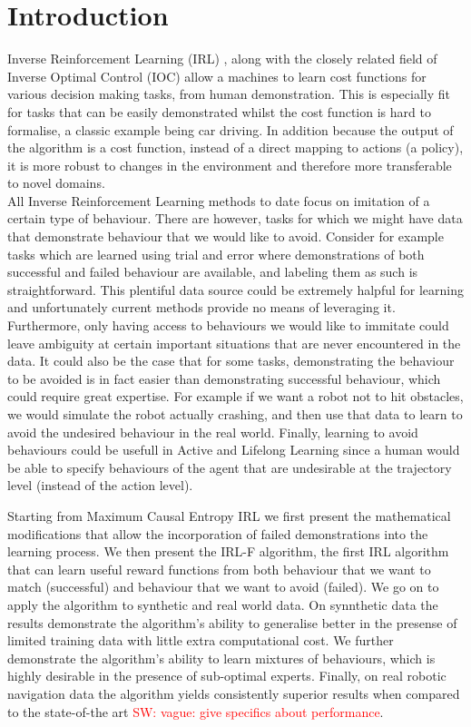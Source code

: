 \documentclass[letterpaper]{article}
\newcommand{\sw}[1]{\textcolor{red}{SW: #1}}
\newcommand{\sw}[1]{}
\begin{document}
\section{Introduction}
	Inverse Reinforcement Learning (IRL) \cite{ng2000algorithms}, along with the closely related field of Inverse Optimal Control (IOC) allow a machines to learn cost functions for various decision making tasks, from human demonstration.  This is especially fit for tasks that can be easily demonstrated whilst the cost function is hard to formalise, a classic example being car driving. In addition because the output of the algorithm is a cost function, instead of a direct mapping to actions (a policy), it is more robust to changes in the environment and therefore more transferable to novel domains.\\
	All Inverse Reinforcement Learning methods to date focus on imitation of a certain type of behaviour. There are however, tasks for which we might have data that demonstrate behaviour that we would like to avoid. Consider for example tasks which are learned using trial and error where demonstrations of both successful and failed behaviour are available, and labeling them as such is straightforward. This plentiful data source could be extremely halpful for learning and unfortunately current methods provide no means of leveraging it. Furthermore, only having access to behaviours we would like to immitate could leave ambiguity at certain important situations that are never encountered in the data. It could also be the case that for some tasks, demonstrating the behaviour to be avoided is in fact easier than demonstrating successful behaviour, which could require great expertise. For example if we want a robot not to hit obstacles, we would simulate the robot actually crashing, and then use that data to learn to avoid the undesired behaviour in the real world. Finally, learning to avoid behaviours could be usefull in Active and Lifelong Learning since a human would be able to specify behaviours of the agent that are undesirable at the trajectory level (instead of the action level). 

	 Starting from Maximum Causal Entropy IRL \cite{ziebart2010modelingthesis} we first present the mathematical modifications that allow the incorporation of failed demonstrations into the learning process. We then present the IRL-F algorithm, the first IRL algorithm that can learn useful reward functions from both behaviour that we want to match (successful) and behaviour that we want to avoid (failed). We go on to apply the algorithm to synthetic and real world data. On synnthetic data the results demonstrate the algorithm's ability to generalise better in the presense of limited training data with little extra computational cost. We further demonstrate the algorithm's ability to learn mixtures of behaviours, which is highly desirable in the presence of sub-optimal experts. Finally, on real robotic navigation data the algorithm yields consistently superior results when compared to the state-of-the art \sw{vague: give specifics about performance}. 
\end{document}
